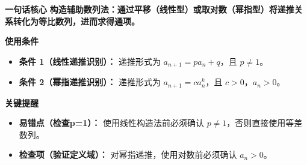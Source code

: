 \begin{summarybox}
	\textbf{\textcolor{CSummary}{一句话核心}}
	\textbf{构造辅助数列法：通过平移（线性型）或取对数（幂指型）将递推关系转化为等比数列，进而求得通项。}

	\medskip
	\textbf{\textcolor{CSummary}{使用条件}}
	\begin{itemize}[leftmargin=*,itemsep=0.5em,topsep=0.4em]
		\item \textbf{条件 1（线性递推识别）：} 递推形式为 $a_{n+1}=p a_n+q$，且 $p\neq1$。
		\item \textbf{条件 2（幂指递推识别）：} 递推形式为 $a_{n+1}=c a_n^k$，且 $c>0$，$a_n>0$。
	\end{itemize}

	\medskip
	\textbf{\textcolor{CSummary}{关键提醒}}
	\begin{itemize}[leftmargin=*,itemsep=0.5em,topsep=0.4em]
		\item \textbf{易错点（检查p=1）：} 使用线性构造法前必须确认 $p\neq1$，否则直接使用等差数列。
		\item \textbf{检查项（验证定义域）：} 对幂指递推，使用对数前必须确认 $a_n>0$。
	\end{itemize}

\end{summarybox}
